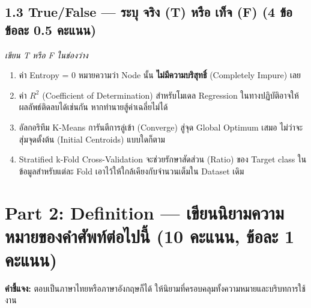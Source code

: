 \documentclass[a4paper,12pt]{article}
\newcommand{\tf}[1]{\fbox{\rule{0pt}{1.1em}\hspace{2.2cm}}}
\begin{document}
\subsection*{1.3 True/False — ระบุ จริง (T) หรือ เท็จ (F) (4 ข้อ ข้อละ 0.5 คะแนน)}
\textit{เขียน T หรือ F ในช่องว่าง}

\begin{enumerate}[label=\textbf{\arabic*.},start=9]
    \item \tf{} \quad ค่า Entropy = 0 หมายความว่า Node นั้น \textbf{ไม่มีความบริสุทธิ์} (Completely Impure) เลย
    \vspace{0.3cm}
    \item \tf{} \quad ค่า $R^2$ (Coefficient of Determination) สำหรับโมเดล Regression ในทางปฏิบัติอาจให้ผลลัพธ์ติดลบได้เช่นกัน หากทำนายสู้ค่าเฉลี่ยไม่ได้
    \vspace{0.3cm}
    \item \tf{} \quad อัลกอริทึม K-Means การันตีการลู่เข้า (Converge) สู่จุด Global Optimum เสมอ ไม่ว่าจะสุ่มจุดตั้งต้น (Initial Centroids) แบบใดก็ตาม
    \vspace{0.3cm}
    \item \tf{} \quad Stratified k-Fold Cross-Validation จะช่วยรักษาสัดส่วน (Ratio) ของ Target class ในข้อมูลสำหรับแต่ละ Fold เอาไว้ให้ใกล้เคียงกับจำนวนเต็มใน Dataset เดิม
    \vspace{0.3cm}
\end{enumerate}

\newpage

\section*{Part 2: Definition — เขียนนิยามความหมายของคำศัพท์ต่อไปนี้ (10 คะแนน, ข้อละ 1 คะแนน)}
\textbf{คำชี้แจง:} ตอบเป็นภาษาไทยหรือภาษาอังกฤษก็ได้ ให้นิยามที่ครอบคลุมทั้งความหมายและบริบทการใช้งาน
\end{document}
